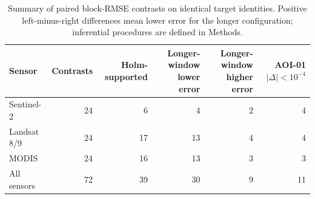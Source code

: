 \begin{table}[!t]\centering\footnotesize
\caption{Summary of paired block-RMSE contrasts on identical target identities. Positive left-minus-right differences mean lower error for the longer configuration; inferential procedures are defined in Methods.}\label{tab:contrasts}
\begin{tabular}{lrrrrr}\toprule
Sensor & Contrasts & Holm-supported & Longer-window lower error & Longer-window higher error & AOI-01 $|\Delta|<10^{-4}$ \\\midrule
Sentinel-2 & 24 & 6 & 4 & 2 & 4 \\
Landsat 8/9 & 24 & 17 & 13 & 4 & 4 \\
MODIS & 24 & 16 & 13 & 3 & 3 \\
All sensors & 72 & 39 & 30 & 9 & 11 \\
\bottomrule\end{tabular}
\end{table}
